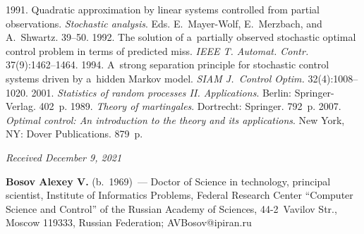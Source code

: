 \begin{multicols}{2}
{{\begin{thebibliography}{99}
       1991. Quadratic approximation by linear systems controlled from 
partial observations. \textit{Stochastic analysis}. Eds. E.~Mayer-Wolf, E.~Merzbach, and A.~Shwartz. 
39--50.
       1992. The solution of a~partially observed stochastic optimal 
control problem in terms of predicted miss. \textit{IEEE T. Automat. Contr.} 37(9):1462--1464.
       1994. A~strong separation principle for stochastic control systems driven by 
a~hidden Markov model. \textit{SIAM J.~Control Optim.} 32(4):1008--1020.
       2001. \textit{Statistics of random processes II. 
Applications}. Berlin: Springer-Verlag. 402~p.
       1989. \textit{Theory of martingales}. Dortrecht: Springer. 
792~p.
       2007. \textit{Optimal control: An introduction to the theory 
and its applications}. New York, NY: Dover Publications. 879~p.
 \end{thebibliography}

 }
 }

\end{multicols}

\vspace*{-6pt}

\hfill{\small\textit{Received December 9, 2021}}     


      
      \Contrl
      
      \noindent
      \textbf{Bosov Alexey V.} (b.\ 1969)~--- Doctor of Science in technology, principal scientist, 
Institute of Informatics Problems, Federal Research Center ``Computer Science and Control'' of the 
Russian Academy of Sciences, 44-2~Vavilov Str., Moscow 119333, Russian Federation; 
\mbox{AVBosov@ipiran.ru}
      
  

\label{end\stat}

\renewcommand{\bibname}{\protect\rm Литература}    
      